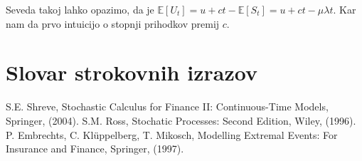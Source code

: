 \documentclass[12pt, a4paper, reqno]{amsart}
\theoremstyle{definition} %
\theoremstyle{plain} %
\newcommand{\geslo}[2]{\noindent\textbf{#1}\hspace*{3mm}\hangindent=\parindent\hangafter=1 #2}
\newcommand{\E}{\mathbb{E}}
\newcommand{\1}{\mathds{1}}
\begin{document}
    Seveda takoj lahko opazimo, da je $\E\left[U_t\right] = u + ct - \E\left[S_t\right] = u + ct - \mu\lambda t$.
    Kar nam da prvo intuicijo o stopnji prihodkov premij $c$.



















\section*{Slovar strokovnih izrazov}

%
%


\begin{thebibliography}{99}

S.E. Shreve, Stochastic Calculus for Finance II: Continuous-Time Models, Springer, (2004).
S.M. Ross, Stochatic Processes: Second Edition, Wiley, (1996).
P. Embrechts, C. Klüppelberg, T. Mikosch, Modelling Extremal Events: For Insurance and Finance, Springer, (1997).
\end{thebibliography}
\end{document}
